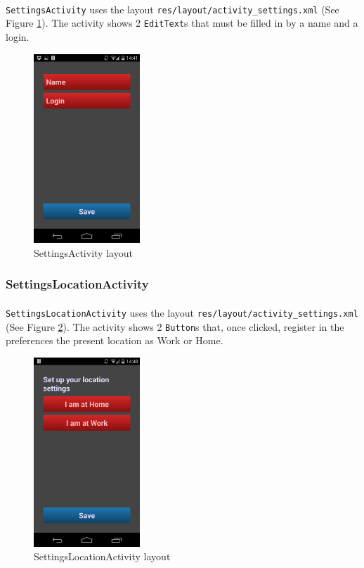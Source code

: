 \documentclass[12pt]{article}
\begin{document}
\paragraph{}\verb?SettingsActivity? uses the layout \verb?res/layout/activity_settings.xml? (See Figure \ref{fig:user}). The activity shows 2 \verb?EditText?s that must be filled in by a name and a login.

\begin{figure}[ht]
	\centering
		\includegraphics[width=4cm]{pictures/user.png}
	\caption{SettingsActivity layout}
	\label{fig:user}
\end{figure}

\subsubsection{SettingsLocationActivity}
\paragraph{}\verb?SettingsLocationActivity? uses the layout \verb?res/layout/activity_settings.xml? (See Figure \ref{fig:location}). The activity shows 2 \verb?Button?s that, once clicked, register in the preferences the present location as Work or Home.

\begin{figure}[ht]
	\centering
		\includegraphics[width=4cm]{pictures/location.png}
	\caption{SettingsLocationActivity layout}
	\label{fig:location}
\end{figure}
\end{document}
